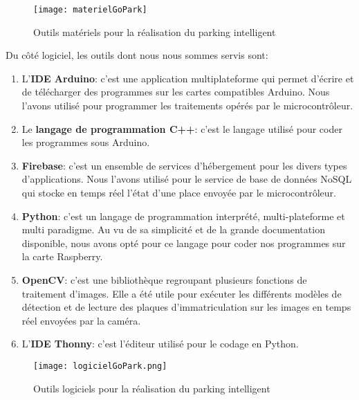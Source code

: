     \begin{figure}
        \centering
        \texttt{[image: materielGoPark]}
        \caption{Outils matériels pour la réalisation du parking intelligent}
    \end{figure}

    Du côté logiciel, les outils dont nous nous sommes servis sont:
    \begin{enumerate}
        \item L’\textbf{IDE Arduino}: c’est une application multiplateforme qui permet d’écrire et de télécharger des programmes sur les cartes compatibles Arduino. Nous l’avons utilisé pour programmer les traitements opérés par le microcontrôleur. 
        \item Le \textbf{langage de programmation C++}: c’est le langage utilisé pour coder les programmes sous Arduino.
        \item \textbf{Firebase}: c’est un ensemble de services d’hébergement pour les divers types d'applications. Nous l’avons utilisé pour le service de base de données NoSQL qui stocke en temps réel l’état d'une place envoyée par le microcontrôleur.
        \item \textbf{Python}: c’est un langage de programmation interprété, multi-plateforme et multi paradigme. Au vu de sa simplicité et de la grande documentation disponible, nous avons opté pour ce langage pour coder nos programmes sur la carte Raspberry. 
        \item \textbf{OpenCV}: c’est une bibliothèque regroupant plusieurs fonctions de traitement d’images. Elle a été utile pour exécuter les différents modèles de détection et de lecture des plaques d'immatriculation sur les images en temps réel envoyées par la caméra.
        \item L’\textbf{IDE Thonny}: c'est l'éditeur utilisé pour le codage en Python.
    \end{enumerate}
    \begin{figure}
        \centering
        \texttt{[image: logicielGoPark.png]}
        \caption{Outils logiciels pour la réalisation du parking intelligent}
    \end{figure}

